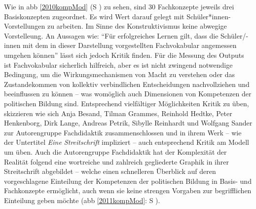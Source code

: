 Wie in \gls{abb} \ref{2010kompMod} (\gls{S} \pageref{2010kompMod}) zu sehen, sind 30 Fachkonzepte jeweils drei Basiskonzepten zugeordnet. Es wird Wert darauf gelegt mit Schüler*innen-Vorstellungen zu arbeiten. Im Sinne des Konstruktivismus keine abwegige Vorstelleung.
An Aussagen wie: \enquote{Für erfolgreiches Lernen gilt, dass die Schüler/-innen mit dem in dieser Darstellung vorgestellten Fachvokabular angemessen umgehen können} \autocite[13]{weißeno.2010} lässt sich jedoch Kritik finden. Für die Messung des Outputs ist Fachvokabular sicherlich hilfreich, aber es ist nicht zwingend notwendige Bedingung, um die Wirkungsmechanismen von Macht zu verstehen oder das Zustandekommen von kollektiv verbindlichen Entscheidungen nachvollziehen und beeinflussen zu können -- was womöglich auch Dimensionen von Kompetenzen der politischen Bildung sind. Entsprechend vielfältiger Möglichkeiten Kritik zu üben, skizzieren \textcite[108-109]{Gloe2020} wie sich Anja Besand, Tilman Grammes, Reinhold Hedtke, Peter Henkenborg, Dirk Lange, Andreas Petrik, Sibylle Reinhardt und Wolfgang Sander zur Autorengruppe Fachdidaktik zusammenschlossen und in ihrem Werk  -- wie der Untertitel \emph{Eine Streitschrift} impliziert -- auch entsprechend Kritik am Modell um \citeauthor{weißeno.2010} üben. 
Auch die Autorengruppe Fachdidaktik hat der Komplexität der Realität folgend eine wortreiche und zahlreich gegliederte Graphik in ihrer Streitschrift abgebildet -- welche einen schnelleren Überblick auf deren vorgeschlagene Einteilung der Kompetenzen der politischen Bildung in Basis- und Fachkonzepte ermöglicht, auch wenn sie keine strengen Vorgaben zur begrifflichen Einteilung geben möchte (\gls{abb} \ref{2011kompMod}: \gls{S} \pageref{2011kompMod}).

